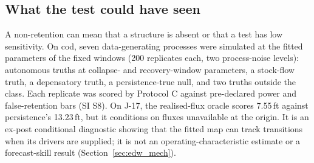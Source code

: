 \subsection{What the test could have seen}\label{sec:power}

A non-retention can mean that a structure is absent or that a test has low sensitivity. On cod, seven data-generating processes were simulated at the fitted parameters of the fixed windows (200 replicates each, two process-noise levels): autonomous truths at collapse- and recovery-window parameters, a stock-flow truth, a depensatory truth, a persistence-true null, and two truths outside the class. Each replicate was scored by Protocol C against pre-declared power and false-retention bars (SI S8). On J-17, the realised-flux oracle scores 7.55\,ft against persistence's 13.23\,ft, but it conditions on fluxes unavailable at the origin. It is an ex-post conditional diagnostic showing that the fitted map can track transitions when its drivers are supplied; it is not an operating-characteristic estimate or a forecast-skill result (Section~\ref{sec:edw_mech}).
